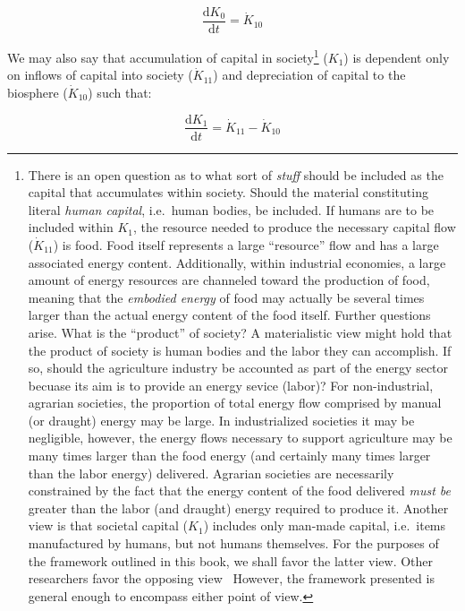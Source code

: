 \begin{equation} \label{eq:A_K0_balance}
	\frac{\mathrm{d}K_{0}}{\mathrm{d}t}		
	= \dot{K}_{10}
\end{equation}

We may also say that accumulation of capital in society\footnote{There is an open
question as to what sort of \emph{stuff} should be included as the capital
that accumulates within society. 
Should the material constituting literal
\emph{human capital}, i.e.~human bodies, be included. 
If humans are to be
included within $K_{1}$, the resource needed to produce the necessary capital
flow ($\dot{K}_{11}$) is food. 
Food itself represents a large ``resource''
flow and has a large associated energy content. 
Additionally, within industrial
economies, a large amount of 
energy resources are channeled toward the production of food, meaning that
the \emph{embodied energy} of food may actually be several times larger than
the actual energy content of the food itself. 
Further questions arise. 
What is the ``product'' of society? 
A materialistic view might hold that the product of
society is human bodies and the labor they can accomplish. 
If so, should
the agriculture industry be accounted as part of the energy sector becuase its 
aim is to provide an energy sevice (labor)? 
For non-industrial, agrarian societies, 
the proportion of total energy flow comprised by manual (or draught) energy may be
large. 
In industrialized societies it may be negligible, however, the energy flows
necessary to support agriculture may be many times larger than the food energy (and
certainly many times larger than the labor energy) delivered. 
Agrarian societies
are necessarily constrained by the fact that the energy content of the food delivered 
\emph{must be} greater than the labor (and draught) energy required to produce it.
Another view is that societal capital ($K_{1}$) includes only man-made capital, 
i.e.\ items manufactured by humans,
but not humans themselves. 
For the purposes of the framework outlined in this book, 
we shall favor the latter view.
Other researchers favor the opposing view~\cite{Giampietro2013}
However,
the framework presented is general enough to encompass either point of view.
} 
($K_{1}$) is dependent only on inflows of capital into society ($\dot{K}_{11}$) 
and depreciation of capital to the biosphere ($\dot{K}_{10}$) such that:

\begin{equation}\label{eq:A_K1_balance}
	\frac{\mathrm{d}K_{1}}{\mathrm{d}t}		
	= \dot{K}_{11}
	- \dot{K}_{10}
\end{equation}


